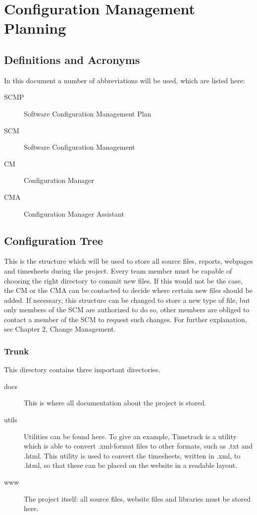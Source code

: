 \chapter{Configuration Management Planning}

\section{Definitions and Acronyms}
In this document a number of abbreviations will be used, which are listed here:
\begin{description}
\item[SCMP]
Software Configuration Management Plan
\item[SCM]
Software Configuration Management
\item[CM]
Configuration Manager
\item[CMA]
Configuration Manager Assistant
\end{description}

\section{Configuration Tree}
This is the structure which will be used to store all source files, reports, webpages and timesheets during the project.
Every team member must be capable of choosing the right directory to commit new files.
If this would not be the case, the CM or the CMA can be contacted to decide where certain new files should be added.
If necessary, this structure can be changed to store a new type of file, but only members of the SCM are authorized to do so, other members are obliged to contact a member of the SCM to request such changes.
For further explanation, see Chapter 2, Change Management.

\subsection{Trunk}
This directory contains three important directories.
\begin{description}
\item[docs]
This is where all documentation about the project is stored.
\item[utils]
Utilities can be found here.
To give an example, Timetrack is a utility which is able to convert .xml-format files to other formats, such as .txt and .html.
This utility is used to convert the timesheets, written in .xml, to .html, so that these can be placed on the website in a readable layout.
\item[www]
The project itself: all source files, website files and libraries must be stored here.
\end{description}

